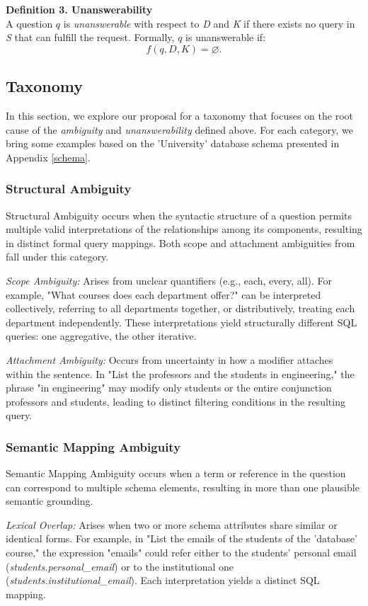 \textbf{Definition 3. Unanswerability} \\
A question \(q\) is \textit{unanswerable} with respect to \textit{D} and \textit{K} if there exists no query in \textit{S} that can fulfill the request. Formally, \(q\) is unanswerable if:
\[
f(q, D, K) = \varnothing.
\]

\subsection{Taxonomy}
In this section, we explore our proposal for a taxonomy that focuses on the root cause of the \textit{ambiguity} and \textit{unanswerability} defined above. For each category, we bring some examples based on the 'University' database schema presented in Appendix \ref{schema}.

\subsubsection{Structural Ambiguity}
Structural Ambiguity occurs when the syntactic structure of a question permits multiple valid interpretations of the relationships among its components, resulting in distinct formal query mappings. Both scope and attachment ambiguities from \cite{Ambrosia} fall under this category.

\textit{Scope Ambiguity:} Arises from unclear quantifiers (e.g., each, every, all). For example, "What courses does each department offer?" can be interpreted collectively, referring to all departments together, or distributively, treating each department independently. These interpretations yield structurally different SQL queries: one aggregative, the other iterative.

\textit{Attachment Ambiguity:} Occurs from uncertainty in how a modifier attaches within the sentence. In "List the professors and the students in engineering," the phrase "in engineering" may modify only students or the entire conjunction professors and students, leading to distinct filtering conditions in the resulting query.

\subsubsection{Semantic Mapping Ambiguity}
Semantic Mapping Ambiguity occurs when a term or reference in the question can correspond to multiple schema elements, resulting in more than one plausible semantic grounding.

\textit{Lexical Overlap:} Arises when two or more schema attributes share similar or identical forms. For example, in "List the emails of the students of the 'database' course," the expression "emails" could refer either to the students' personal email (\textit{students.personal\_email}) or to the institutional one (\textit{students.institutional\_email}). Each interpretation yields a distinct SQL mapping.

